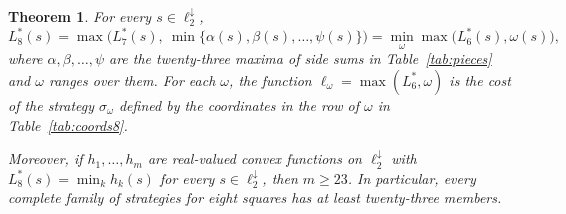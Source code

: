 \documentclass[12pt]{amsart}
\newtheorem{theorem}{Theorem}[section]
\theoremstyle{definition}
\theoremstyle{remark}
\numberwithin{equation}{section}
\numberwithin{figure}{section}
\numberwithin{table}{section}
\begin{document}
\begin{theorem}\label{thm:main}
For every $s\in\ell_2^\downarrow$,
\[
L_8^*(s)=\max\bigl(L_7^*(s),\ \min\{\alpha(s),\beta(s),\ldots,\psi(s)\}\bigr)
=\min_\omega\max\bigl(L_6^*(s),\omega(s)\bigr),
\]
where $\alpha,\beta,\ldots,\psi$ are the twenty-three maxima of side sums
in Table~\ref{tab:pieces} and $\omega$ ranges over them. For each $\omega$,
the function $\ell_\omega=\max(L_6^*,\omega)$ is the cost of the strategy
$\sigma_\omega$ defined by the coordinates in the row of $\omega$ in
Table~\ref{tab:coords8}.

Moreover, if $h_1,\ldots,h_m$ are real-valued convex functions on
$\ell_2^\downarrow$ with $L_8^*(s)=\min_kh_k(s)$ for every
$s\in\ell_2^\downarrow$, then $m\ge23$. In particular, every complete family
of strategies for eight squares has at least twenty-three members.
\end{theorem}
\begingroup
\small
\renewcommand{\arraystretch}{1.12}
\end{document}

